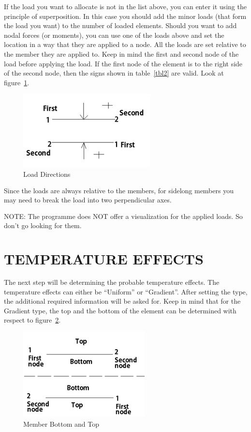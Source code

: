 \documentclass{article}
\begin{document}
If the load you want to allocate is not in the list above, you can enter it using the principle of superposition. In this case you should add the minor loads (that form the load you want) to the number of loaded elements.
Should you want to add nodal forces (or moments), you can use one of the loads above and set the location in a way that they are applied to a node.
All the loads are set relative to the member they are applied to. Keep in mind the first and second node of the load before applying the load. If the first node of the element is to the right side of the second node, then the signs shown in table~\ref{tbl2} are valid. Look at figure~\ref{p1}.
\begin{figure}
\centering
 \includegraphics{loaddir.jpg}
 \caption{Load Directions}
 \label{p1}
 \end{figure}
 
 Since the loads are always relative to the members, for sidelong members you may need to break the load into two perpendicular axes.
 
 NOTE: The programme does NOT offer a visualization for the applied loads. So don’t go looking for them.
 \section{TEMPERATURE EFFECTS}
 The next step will be determining the probable temperature effects. The temperature effects can either be “Uniform” or “Gradient”. After setting the type, the additional required information will be asked for. Keep in mind that for the Gradient type, the top and the bottom of the element can be determined with respect to figure~\ref{p2}.
 \begin{figure}
\centering
 \includegraphics{bot.jpg}
 \caption{Member Bottom and Top}
 \label{p2}
 \end{figure}
 
\end{document}

